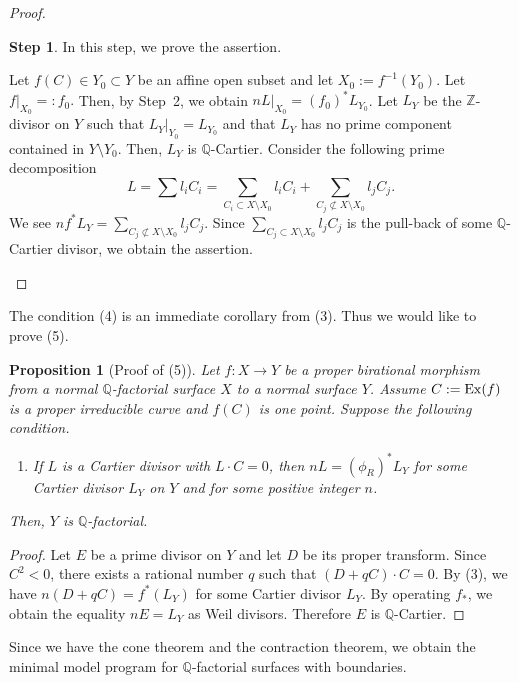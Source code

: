 \documentclass[12pt,twoside]{amsart}
\newtheorem{prop}[thm]{Proposition}
\theoremstyle{definition}
\newtheorem{step}{Step}
\newcommand{\Q}{$\mathbb{Q}$}
\begin{document}
\begin{proof}
\begin{step}
In this step, we prove the assertion. 

Let $f(C)\in Y_0\subset Y$ be an affine open subset and let 
$X_0:=f^{-1}(Y_0).$ 
Let $f|_{X_0}=:f_0.$ 
Then, by Step~2, we obtain $nL|_{X_0}=(f_0)^*L_{Y_0}$. 
Let $L_Y$ be the $\mathbb Z$-divisor on $Y$ 
such that $L_Y|_{Y_0}=L_{Y_0}$ and that $L_Y$ has no prime component contained in $Y\setminus Y_0$. 
Then, $L_Y$ is \Q-Cartier. 
Consider the following prime decomposition 
$$L=\sum l_iC_i=\sum_{C_i\subset X\setminus X_0}l_iC_i+\sum_{C_j\not\subset X\setminus X_0}l_jC_j.$$
We see $nf^*L_Y=\sum_{C_j\not\subset X\setminus X_0}l_jC_j.$ 
Since $\sum_{C_j\subset X\setminus X_0}l_jC_j$ is the pull-back of some \Q-Cartier divisor, 
we obtain the assertion. 
\end{step}
\end{proof}

The condition (4) is an immediate corollary from (3). 
Thus we would like to prove (5). 

\begin{prop}[Proof of (5)]\label{(5)}
Let $f:X \to Y$ be a proper birational morphism 
from a normal \Q-factorial surface $X$ 
to a normal surface $Y$. 
Assume $C:={\rm Ex}(f)$ is a proper irreducible curve and $f(C)$ is one point. 
Suppose the following condition. 
\begin{enumerate}
\item[(3)]{If $L$ is a Cartier divisor with $L\cdot C=0$, 
then $nL=(\phi_R)^*L_Y$ for some Cartier divisor $L_Y$ on $Y$ and 
for some positive integer $n$.}
\end{enumerate}
Then, $Y$ is \Q-factorial.
\end{prop}

\begin{proof}
Let $E$ be a prime divisor on $Y$ and let $D$ be its proper transform. 
Since $C^2<0$, there exists a rational number $q$ such that $(D+qC)\cdot C=0$. 
By (3), we have $n(D+qC)=f^*(L_Y)$ 
for some Cartier divisor $L_Y$. 
By operating $f_*$, we obtain the equality $nE=L_Y$ as Weil divisors. 
Therefore $E$ is \Q-Cartier.
\end{proof}


Since we have the cone theorem and the contraction theorem, 
we obtain the minimal model program for \Q-factorial surfaces with boundaries. 
\end{document}
